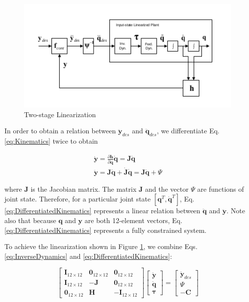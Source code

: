 \documentclass{llncs}
\begin{document}
\begin{figure}[b]
\includegraphics[height=2.2in]{TwoStageLinearization}
\caption{Two-stage Linearization}
\label{fig:TwoStageLinearization}       
\end{figure}

In order to obtain a relation between $\ddot{\mathbf{y}}_{des}$ and $\ddot{\mathbf{q}}_{des}$, 
we differentiate Eq. \ref{eq:Kinematics} twice to obtain

\begin{eqnarray}
\dot{\mathbf{y}} = \frac{\partial \mathbf{h}}{\partial \mathbf{q}} \dot{\mathbf{q}} = \mathbf{J} \dot{\mathbf{q}}\\
\ddot{\mathbf{y}} = \mathbf{J} \ddot{\mathbf{q}} + \dot{\mathbf{J}} \dot{\mathbf{q}} = \mathbf{J} \ddot{\mathbf{q}} + \Psi
\label{eq:DifferentiatedKinematics}
\end{eqnarray}

\noindent where $\mathbf{J}$ is the Jacobian matrix.
The matrix $\mathbf{J}$ and the vector $\Psi$ are functions of joint state.
Therefore, for a particular joint state $\left[ \mathbf{q}^T, \dot{\mathbf{q}}^T  \right]$, Eq. \ref{eq:DifferentiatedKinematics} represents 
a linear relation between $\ddot{\mathbf{q}}$ and $\ddot{\mathbf{y}}$.
Note also that because $\mathbf{q}$ and $\mathbf{y}$ are both 12-element vectors, Eq. \ref{eq:DifferentiatedKinematics} represents a fully constrained system.

To achieve the linearization shown in Figure \ref{fig:TwoStageLinearization}, we combine Eqs. \ref{eq:InverseDynamics} and \ref{eq:DifferentiatedKinematics}:

\begin{equation}
\begin{bmatrix}
\mathbf{I}_{12 \times 12} & \mathbf{0}_{12 \times 12} & \mathbf{0}_{12 \times 12} \\
\mathbf{I}_{12 \times 12} & - \mathbf{J} & \mathbf{0}_{12 \times 12} \\
\mathbf{0}_{12 \times 12} & \mathbf{H} & - \mathbf{I}_{12 \times 12}
\end{bmatrix}
\begin{bmatrix}
\ddot{\mathbf{y}} \\
\ddot{\mathbf{q}} \\
\mathbf{\tau} 
\end{bmatrix} = 
\begin{bmatrix}
\ddot{\mathbf{y}}_{des} \\
\Psi \\
- \mathbf{C} 
\end{bmatrix}
\label{eq:FBLin}
\end{equation}
\end{document}
